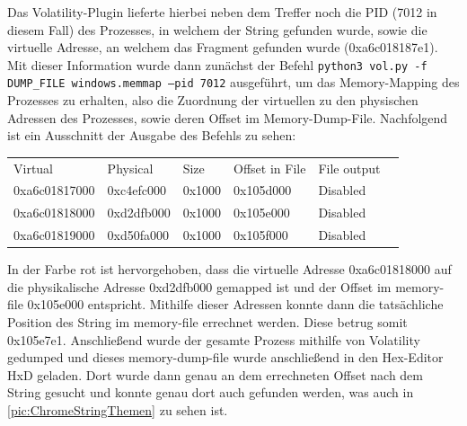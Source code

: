 Das Volatility-Plugin lieferte hierbei neben dem Treffer noch die PID (7012 in diesem Fall) des Prozesses, in welchem der String gefunden wurde, sowie die virtuelle Adresse, an welchem das Fragment gefunden wurde (0xa6c018187e1). Mit dieser Information wurde dann zunächst der Befehl \texttt{python3 vol.py -f DUMP\_FILE windows.memmap --pid 7012} ausgeführt, um das Memory-Mapping des Prozesses zu erhalten, also die Zuordnung der virtuellen zu den physischen Adressen des Prozesses, sowie deren Offset im Memory-Dump-File. Nachfolgend ist ein Ausschnitt der Ausgabe des Befehls zu sehen:

\begin{table}[h!]
	\centering
	\begin{tabular}{llllll}
		Virtual                              & Physical                          & Size                          & Offset in File                   & File output                     &  \\
		0xa6c01817000                        & 0xc4efc000                        & 0x1000                        & 0x105d000                        & Disabled                        &  \\
		{\color[HTML]{FE0000} 0xa6c01818000} & {\color[HTML]{FE0000} 0xd2dfb000} & {\color[HTML]{FE0000} 0x1000} & {\color[HTML]{FE0000} 0x105e000} & {\color[HTML]{FE0000} Disabled} &  \\
		0xa6c01819000                        & 0xd50fa000                        & 0x1000                        & 0x105f000                        & Disabled                        & 
	\end{tabular}
\end{table}

In der Farbe rot ist hervorgehoben, dass die virtuelle Adresse 0xa6c01818000 auf die physikalische Adresse 0xd2dfb000 gemapped ist und der Offset im memory-file 0x105e000 entspricht. Mithilfe dieser Adressen konnte dann die tatsächliche Position des String im memory-file errechnet werden. Diese betrug somit 0x105e7e1. Anschließend wurde der gesamte Prozess mithilfe von Volatility gedumped und dieses memory-dump-file wurde anschließend in den Hex-Editor HxD geladen. Dort wurde dann genau an dem errechneten Offset nach dem String gesucht und konnte genau dort auch gefunden werden, was auch in \autoref{pic:ChromeStringThemen} zu sehen ist.

